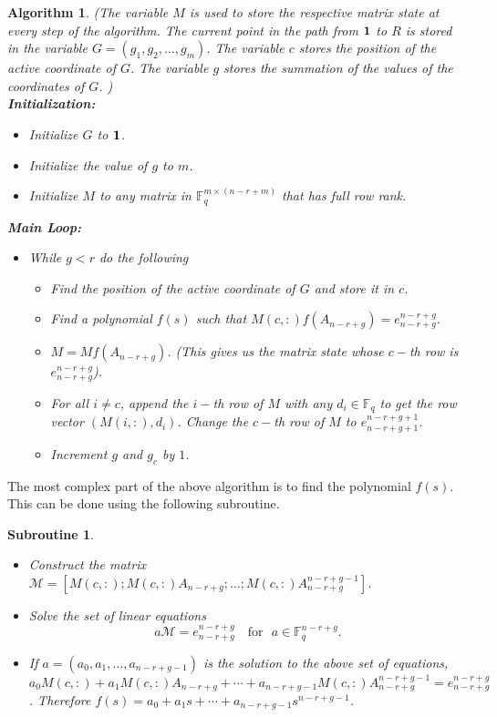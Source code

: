 \documentclass[letterpaper, 12 pt]{article}  \usepackage{amssymb}
\newtheorem{algorithm}[theorem]{Algorithm}
\newtheorem{subroutine}[theorem]{Subroutine}
\newcommand{\F}{\mathbb{F}}
\begin{document}
\begin{algorithm}
\label{algo}
(The variable $M$ is used to store the respective matrix state at every step of
the algorithm. The current point in the path from ${\bf 1}$ to $R$ is stored in
the variable $G = (g_1,g_2,\ldots,g_m)$. The variable $c$ stores the position of
the active coordinate of $G$. The variable $g$ stores the summation of the
values of the coordinates of $G$. ) \\
{\bf Initialization:}
\begin{itemize}
 \item Initialize $G$ to ${\bf 1}$.  
 \item Initialize the value of $g$ to $m$.
 \item Initialize $M$ to any matrix in $\F_q^{m \times (n-r+m)}$ that has full
row rank.  
\end{itemize}
{\bf Main Loop:}
 \begin{itemize}
    \item While $g < r$ do the following
    \begin{itemize}
    \item Find the position of the active coordinate of $G$ and store it
in $c$. 
    \item Find a polynomial $f(s)$ such
that $M(c,:)f(A_{n-r+g}) = e_{n-r+g}^{n-r+g}$.
                       \item $M = M f(A_{n-r+g})$. (This gives us the matrix
state whose $c-$th row is $e_{n-r+g}^{n-r+g}$).
                       \item  For all $i \neq c$, append the $i-$th row of $M$
with any  $d_i \in \F_q$ to get the row vector $(M(i,:),d_i)$. Change the $c-$th
row of $M$ to $e_{n-r+g+1}^{n-r+g+1}$.
                       \item Increment $g$ and $g_c$ by $1$. 
       \end{itemize}
   \end{itemize}
\end{algorithm}
The most complex part of the above algorithm is to find the polynomial $f(s)$.
This can be done using the following subroutine.
\begin{subroutine}
\begin{itemize}
 \item Construct the matrix $\mathscr{M} =
[M(c,:);M(c,:)A_{n-r+g};\ldots;M(c,:)A_{n-r+g}^{n-r+g-1}]$.
 \item Solve the set of linear equations 
\begin{equation}
\label{polycalc}
a\mathscr{M} = e_{n-r+g}^{n-r+g} \,\,\,\, \textrm{ for }\,\, a \in \F_q^{n-r+g}.
\end{equation}
 \item If $a = (a_0,a_1,\ldots,a_{n-r+g-1})$ is the solution to the above set of
equations, $a_0M(c,:) + a_1M(c,:)A_{n-r+g} + \cdots +
a_{n-r+g-1}M(c,:)A_{n-r+g}^{n-r+g-1} = e_{n-r+g}^{n-r+g}$. Therefore $f(s) = a_0
+ a_1s + \cdots + a_{n-r+g-1}s^{n-r+g-1}$.
\end{itemize}
\end{subroutine}
\end{document}
